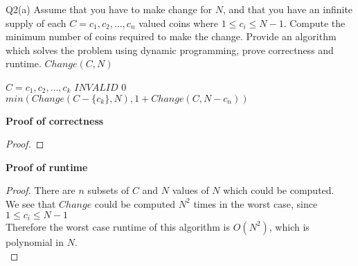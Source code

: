 \begin{problem}
  {Q2(a)}
  Assume that you have to make change for $N$, and that you have an infinite supply of each $C = c_1, c_2, \dots, c_n$ valued coins where $1 \leq c_i \leq N-1$.
  Compute the minimum number of coins required to make the change. Provide an algorithm which solves the problem using dynamic programming, prove correctness and runtime.
  $Change(C, N)$
  \begin{algorithmic}[1]
      \STATE $C = c_1, c_2, \dots, c_k$
      \RETURN $INVALID$
      \ENDIF
      \RETURN $0$
      \ENDIF
      \RETURN $min(Change(C - \{c_k\}, N), 1 + Change(C, N-c_n))$
  \end{algorithmic}
  \noindent
  \textbf{Proof of correctness}
  \begin{proof}
  \end{proof}
  \textbf{Proof of runtime}
  \begin{proof}
      There are $n$ subsets of $C$ and $N$ values of $N$ which could be computed. \\
      We see that $Change$ could be computed $N^2$ times in the worst case, since $1 \leq c_i \leq N-1$ \\
      Therefore the worst case runtime of this algorithm is $O(N^2)$, which is polynomial in $N$. \\
  \end{proof}
\end{problem}

